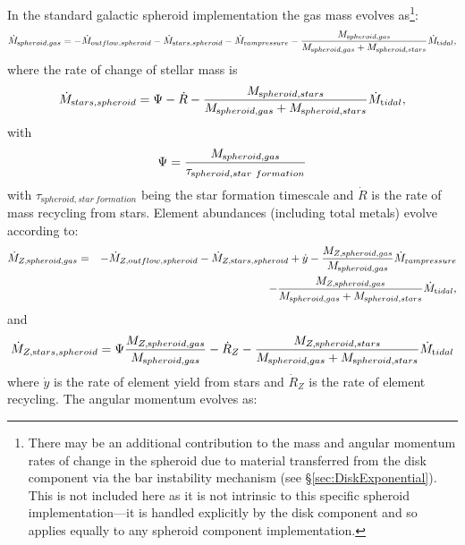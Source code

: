 In the standard galactic spheroid implementation the gas mass evolves as\footnote{There may be an additional contribution to the mass and angular momentum rates of change in the spheroid due to material transferred from the disk \gls{component} via the bar instability mechanism (see \S\protect\ref{sec:DiskExponential}). This is not included here as it is not intrinsic to this specific spheroid implementation---it is handled explicitly by the disk \gls{component} and so applies equally to any spheroid \gls{component} implementation.}:
\begin{equation}
 \dot{M}_{\mathrm spheroid, gas} = - \dot{M}_{\mathrm outflow, spheroid} - \dot{M}_{\mathrm stars, spheroid} - \dot{M}_{\mathrm ram pressure} - {M_{\mathrm spheroid, gas} \over M_{\mathrm spheroid, gas} + M_{\mathrm spheroid, stars}} \dot{M}_{\mathrm tidal},
\end{equation}
where the rate of change of stellar mass is
\begin{equation}
 \dot{M}_{\mathrm stars, spheroid} = \Psi - \dot{R} - {M_{\mathrm spheroid, stars} \over M_{\mathrm spheroid, gas} + M_{\mathrm spheroid, stars}} \dot{M}_{\mathrm tidal},
\end{equation}
with
\begin{equation}
 \Psi = {M_{\mathrm spheroid, gas} \over \tau_{\mathrm spheroid, star~formation}}
\end{equation}
with $\tau_{\mathrm spheroid, star~formation}$ being the star formation timescale and $\dot{R}$ is the rate of mass recycling from stars.
Element abundances (including total metals) evolve according to:
\begin{eqnarray}
  \dot{M}_{Z, {\mathrm spheroid, gas}} &=& - \dot{M}_{Z, {\mathrm outflow, spheroid}} - \dot{M}_{Z, {\mathrm stars, spheroid}} + \dot{y} - {M_{Z, {\mathrm spheroid, gas}} \over M_{\mathrm spheroid, gas}} \dot{M}_{\mathrm ram pressure} \nonumber \\ 
 & & - {M_{Z, {\mathrm spheroid, gas}} \over M_{\mathrm spheroid, gas} + M_{\mathrm spheroid, stars}} \dot{M}_{\mathrm tidal},
\end{eqnarray}
and
\begin{equation}
 \dot{M}_{Z, {\mathrm stars, spheroid}} = \Psi {M_{Z, {\mathrm spheroid, gas}} \over M_{\mathrm spheroid, gas}} - \dot{R}_Z - {M_{Z, {\mathrm spheroid, stars}} \over M_{\mathrm spheroid, gas} + M_{\mathrm spheroid, stars}} \dot{M}_{\mathrm tidal}
\end{equation}
where $\dot{y}$ is the rate of element yield from stars and $\dot{R}_Z$ is the rate of element recycling. The angular momentum evolves as:
